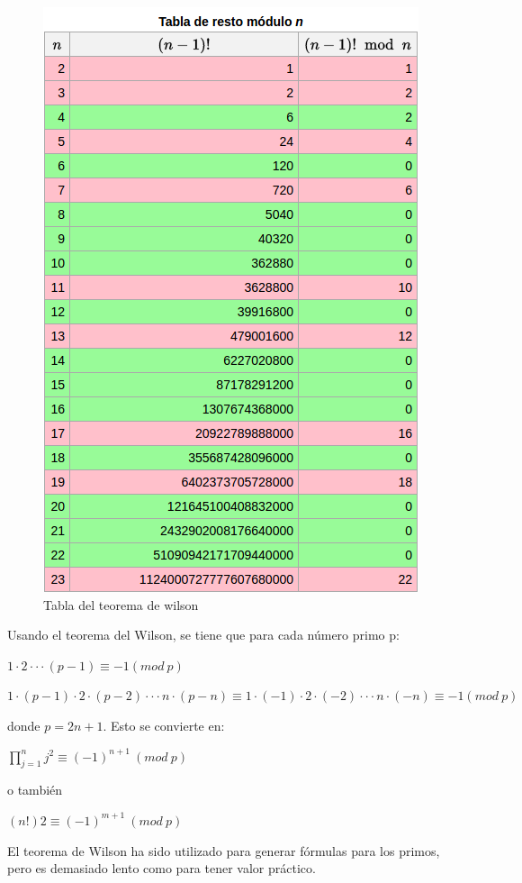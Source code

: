 \documentclass[11pt, conference]{IEEEtran}
\begin{document}
\begin{figure}[h]
	\begin{center}
		\includegraphics[scale=0.5]{1.png}
		\caption{Tabla del teorema de wilson} 
	\end{center}
\end{figure}

Usando el teorema del Wilson, se tiene que para cada número primo p:

$1\cdot2\cdot\cdot\cdot(p-1)\equiv-1(mod\ p)$

$1\cdot(p-1)\cdot2\cdot(p-2)\cdot\cdot\cdot n\cdot(p-n)\equiv1\cdot(-1)\cdot2\cdot(-2)\cdot\cdot\cdot n\cdot(-n)\equiv-1(mod\ p)$

donde $p=2n+1$. Esto se convierte en:

$\displaystyle\prod_{j=1}^n j^{2}\equiv(-1)^{n+1}\  (mod\ p)$  

o también

$(n!){2}\equiv(-1)^{m+1}\ (mod\ p)$  

El teorema de Wilson ha sido utilizado para generar fórmulas para los primos, pero es demasiado lento como para tener valor práctico.
\end{document}
